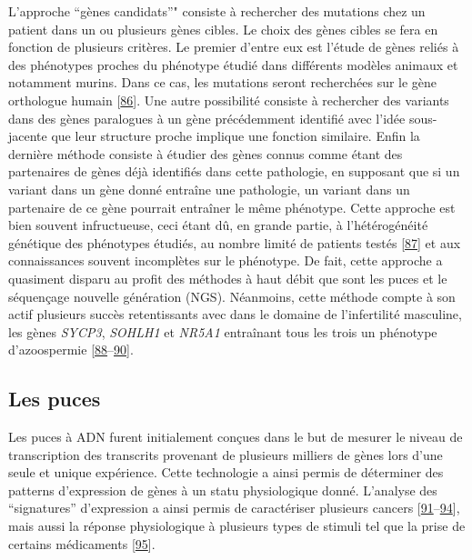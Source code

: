 \documentclass[12pt,twoside]{ugathesis}
\theoremstyle{definition}
\theoremstyle{definition}
\theoremstyle{remark}
\begin{document}
L'approche ``gènes candidats''" consiste à rechercher des mutations chez
un patient dans un ou plusieurs gènes cibles. Le choix des gènes cibles
se fera en fonction de plusieurs critères. Le premier d'entre eux est
l'étude de gènes reliés à des phénotypes proches du phénotype étudié
dans différents modèles animaux et notamment murins. Dans ce cas, les
mutations seront recherchées sur le gène orthologue humain
{[}\protect\hyperlink{ref-DeBoer2015}{86}{]}. Une autre possibilité
consiste à rechercher des variants dans des gènes paralogues à un gène
précédemment identifié avec l'idée sous-jacente que leur structure
proche implique une fonction similaire. Enfin la dernière méthode
consiste à étudier des gènes connus comme étant des partenaires de gènes
déjà identifiés dans cette pathologie, en supposant que si un variant
dans un gène donné entraîne une pathologie, un variant dans un
partenaire de ce gène pourrait entraîner le même phénotype. Cette
approche est bien souvent infructueuse, ceci étant dû, en grande partie,
à l'hétérogénéité génétique des phénotypes étudiés, au nombre limité de
patients testés {[}\protect\hyperlink{ref-ElInati2012}{87}{]} et aux
connaissances souvent incomplètes sur le phénotype. De fait, cette
approche a quasiment disparu au profit des méthodes à haut débit que
sont les puces et le séquençage nouvelle génération (NGS). Néanmoins,
cette méthode compte à son actif plusieurs succès retentissants avec
dans le domaine de l'infertilité masculine, les gènes \emph{SYCP3},
\emph{SOHLH1} et \emph{NR5A1} entraînant tous les trois un phénotype
d'azoospermie
{[}\protect\hyperlink{ref-Miyamoto2003}{88}--\protect\hyperlink{ref-Bashamboo2010}{90}{]}.

\newpage

\subsection{Les puces}\label{les-puces}

Les puces à ADN furent initialement conçues dans le but de mesurer le
niveau de transcription des transcrits provenant de plusieurs milliers
de gènes lors d'une seule et unique expérience. Cette technologie a
ainsi permis de déterminer des patterns d'expression de gènes à un statu
physiologique donné. L'analyse des ``signatures'' d'expression a ainsi
permis de caractériser plusieurs cancers
{[}\protect\hyperlink{ref-Alon1999}{91}--\protect\hyperlink{ref-VantVeer2002}{94}{]},
mais aussi la réponse physiologique à plusieurs types de stimuli tel que
la prise de certains médicaments
{[}\protect\hyperlink{ref-Brachat2002}{95}{]}.
\end{document}
